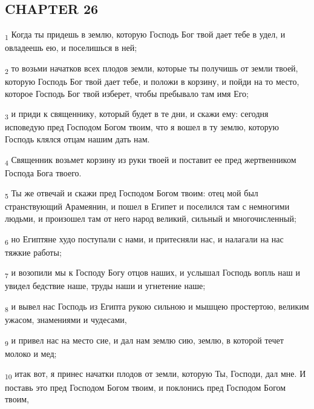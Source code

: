 \subsection{CHAPTER 26}
\begin{tcolorbox}
\textsubscript{1} Когда ты придешь в землю, которую Господь Бог твой дает тебе в удел, и овладеешь ею, и поселишься в ней;
\end{tcolorbox}
\begin{tcolorbox}
\textsubscript{2} то возьми начатков всех плодов земли, которые ты получишь от земли твоей, которую Господь Бог твой дает тебе, и положи в корзину, и пойди на то место, которое Господь Бог твой изберет, чтобы пребывало там имя Его;
\end{tcolorbox}
\begin{tcolorbox}
\textsubscript{3} и приди к священнику, который будет в те дни, и скажи ему: сегодня исповедую пред Господом Богом твоим, что я вошел в ту землю, которую Господь клялся отцам нашим дать нам.
\end{tcolorbox}
\begin{tcolorbox}
\textsubscript{4} Священник возьмет корзину из руки твоей и поставит ее пред жертвенником Господа Бога твоего.
\end{tcolorbox}
\begin{tcolorbox}
\textsubscript{5} Ты же отвечай и скажи пред Господом Богом твоим: отец мой был странствующий Арамеянин, и пошел в Египет и поселился там с немногими людьми, и произошел там от него народ великий, сильный и многочисленный;
\end{tcolorbox}
\begin{tcolorbox}
\textsubscript{6} но Египтяне худо поступали с нами, и притесняли нас, и налагали на нас тяжкие работы;
\end{tcolorbox}
\begin{tcolorbox}
\textsubscript{7} и возопили мы к Господу Богу отцов наших, и услышал Господь вопль наш и увидел бедствие наше, труды наши и угнетение наше;
\end{tcolorbox}
\begin{tcolorbox}
\textsubscript{8} и вывел нас Господь из Египта рукою сильною и мышцею простертою, великим ужасом, знамениями и чудесами,
\end{tcolorbox}
\begin{tcolorbox}
\textsubscript{9} и привел нас на место сие, и дал нам землю сию, землю, в которой течет молоко и мед;
\end{tcolorbox}
\begin{tcolorbox}
\textsubscript{10} итак вот, я принес начатки плодов от земли, которую Ты, Господи, дал мне. И поставь это пред Господом Богом твоим, и поклонись пред Господом Богом твоим,
\end{tcolorbox}
